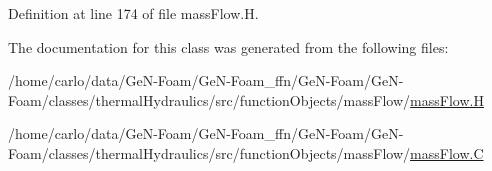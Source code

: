 Definition at line 174 of file mass\+Flow.\+H.



The documentation for this class was generated from the following files\+:\begin{DoxyCompactItemize}
\item 
/home/carlo/data/\+Ge\+N-\/\+Foam/\+Ge\+N-\/\+Foam\+\_\+ffn/\+Ge\+N-\/\+Foam/\+Ge\+N-\/\+Foam/classes/thermal\+Hydraulics/src/function\+Objects/mass\+Flow/\hyperlink{massFlow_8H}{mass\+Flow.\+H}\item 
/home/carlo/data/\+Ge\+N-\/\+Foam/\+Ge\+N-\/\+Foam\+\_\+ffn/\+Ge\+N-\/\+Foam/\+Ge\+N-\/\+Foam/classes/thermal\+Hydraulics/src/function\+Objects/mass\+Flow/\hyperlink{massFlow_8C}{mass\+Flow.\+C}\end{DoxyCompactItemize}
